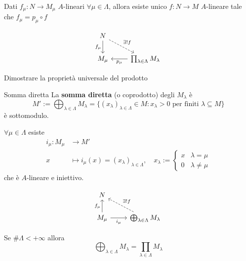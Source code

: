 \begin{proposition} \( \) 
    \\ Dati \(f_\mu : N \to M_\mu \) \(A\)-lineari \(\forall \mu \in \Lambda\),
    allora esiste unico \(f : N\to M\) \(A\)-lineare tale che \(f_\mu = p_\mu \circ f\) 
\end{proposition}
\[\begin{tikzcd}
	N \\
	{M_\mu} & \prod_{\lambda \in \Lambda} M_{\lambda} 
	\arrow["{f_\mu}"', from=1-1, to=2-1]
	\arrow["{\exists ! f}", dashed, from=1-1, to=2-2]
	\arrow["{p_\mu}", from=2-2, to=2-1]
\end{tikzcd}\]

\begin{eser}{}
    Dimostrare la proprietà universale del prodotto
\end{eser}


\begin{definition}{Somma diretta}
    La \textbf{somma diretta} (o coprodotto) degli \(M_{\lambda} \) è 
    \[
        M' := \bigoplus_{\lambda \in \Lambda} M_\lambda = \{{(x_\lambda)}_{\lambda \in \Lambda} \in M : x_\lambda >0 \text{ per
  finiti \(\lambda\)} \subseteq M \}
    \]
    è sottomodulo.
\end{definition}

\(\forall \mu \in \Lambda\) esiste
\begin{align*}
    i_\mu: M_\mu &\longrightarrow M' \\
    x &\longmapsto i_\mu(x) = {(x_{\lambda} )}_{\lambda \in \Lambda}, \quad
    x_\lambda := \begin{cases}{}
        x & \lambda = \mu \\
        0 & \lambda \neq \mu
    \end{cases}
\end{align*}
che è \(A\)-lineare e iniettivo.

\begin{proposition}
\[\begin{tikzcd}
	N \\
	{M_\mu} & \bigoplus_{\lambda \in \Lambda} M_\lambda
	\arrow["{f_\mu}", from=2-1, to=1-1]
	\arrow["{i_\mu}"', from=2-1, to=2-2]
	\arrow["{\exists! f}"', dashed, from=2-2, to=1-1]
\end{tikzcd}\]
\end{proposition}
\begin{remark}{}
    Se \(\#\Lambda < +\infty\) allora 
    \[
      \bigoplus_{\lambda \in \Lambda} M_\lambda = \prod_{\lambda \in \Lambda} M_{\lambda} 
    \]
\end{remark}

